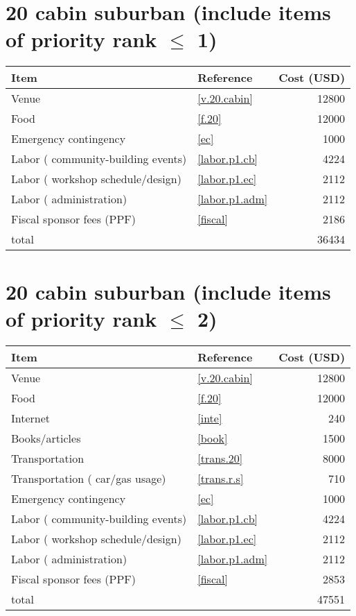 \section*{20 cabin suburban (include items of priority rank $\leq$ 1)}
\begin{center}
\begin{tabular}{llr}
Item & Reference & Cost (USD) \\ \hline
Venue & \ref{v.20.cabin} & 12800 \\
Food & \ref{f.20} & 12000 \\
Emergency contingency & \ref{ec} & 1000 \\
Labor ( community-building events) & \ref{labor.p1.cb} & 4224 \\
Labor ( workshop schedule/design) & \ref{labor.p1.ec} & 2112 \\
Labor ( administration) & \ref{labor.p1.adm} & 2112 \\
Fiscal sponsor fees (PPF) & \ref{fiscal} & 2186 \\ \hline
total &  & 36434
\end{tabular}
\end{center}
\newpage
\section*{20 cabin suburban (include items of priority rank $\leq$ 2)}
\begin{center}
\begin{tabular}{llr}
Item & Reference & Cost (USD) \\ \hline
Venue & \ref{v.20.cabin} & 12800 \\
Food & \ref{f.20} & 12000 \\
Internet & \ref{inte} & 240 \\
Books/articles & \ref{book} & 1500 \\
Transportation & \ref{trans.20} & 8000 \\
Transportation ( car/gas usage) & \ref{trans.r.s} & 710 \\
Emergency contingency & \ref{ec} & 1000 \\
Labor ( community-building events) & \ref{labor.p1.cb} & 4224 \\
Labor ( workshop schedule/design) & \ref{labor.p1.ec} & 2112 \\
Labor ( administration) & \ref{labor.p1.adm} & 2112 \\
Fiscal sponsor fees (PPF) & \ref{fiscal} & 2853 \\ \hline
total &  & 47551
\end{tabular}
\end{center}
\newpage
